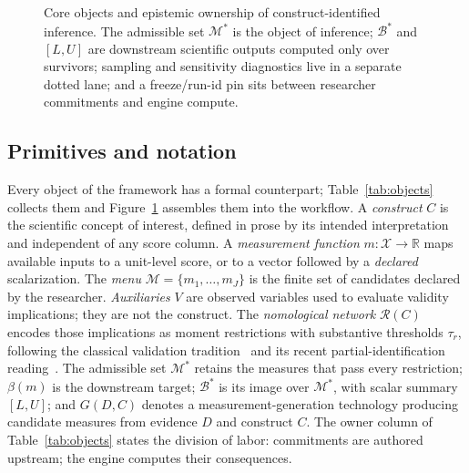 \documentclass[10pt,letterpaper]{article}
\newcommand{\M}{\ensuremath{\mathcal{M}}}
\newcommand{\Rset}{\mathcal{R}}
\newcommand{\Bset}{\mathcal{B}}
\begin{document}
\begin{figure}[t]
\caption{Core objects and epistemic ownership of construct-identified inference.
The admissible set $\M^*$ is the object of inference; $\Bset^*$ and $[L,U]$ are downstream scientific outputs computed only over survivors; sampling and sensitivity diagnostics live in a separate dotted lane; and a freeze/run-id pin sits between researcher commitments and engine compute.}
\label{fig:core}
\end{figure}


\subsection{Primitives and notation}
\label{sec:primitives}

Every object of the framework has a formal counterpart; Table~\ref{tab:objects} collects them and Figure~\ref{fig:core} assembles them into the workflow.
A \emph{construct} $C$ is the scientific concept of interest, defined in prose by its intended interpretation and independent of any score column.
A \emph{measurement function} $m:\mathcal{X}\to\mathbb{R}$ maps available inputs to a unit-level score, or to a vector followed by a \emph{declared} scalarization.
The \emph{menu} $\M=\{m_1,\ldots,m_J\}$ is the finite set of candidates declared by the researcher.
\emph{Auxiliaries} $V$ are observed variables used to evaluate validity implications; they are not the construct.
The \emph{nomological network} $\Rset(C)$ encodes those implications as moment restrictions with substantive thresholds $\tau_r$, following the classical validation tradition~\cite{cronbach1955,campbell1959} and its recent partial-identification reading~\cite{dellrambachan2026}.
The admissible set $\M^*$ retains the measures that pass every restriction; $\beta(m)$ is the downstream target; $\Bset^*$ is its image over $\M^*$, with scalar summary $[L,U]$; and $G(D,C)$ denotes a measurement-generation technology producing candidate measures from evidence $D$ and construct $C$.
The owner column of Table~\ref{tab:objects} states the division of labor: commitments are authored upstream; the engine computes their consequences.
\end{document}
